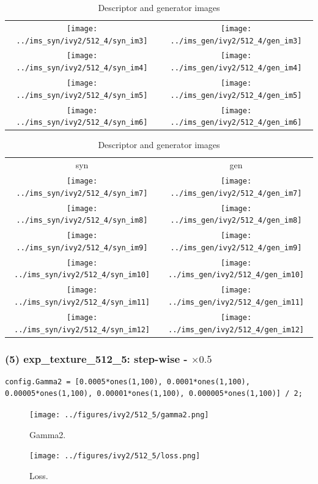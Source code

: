 \documentclass[letter]{article}
\begin{document}
\begin{table}[h!]
\begin{tabular}{cc}
		\texttt{[image: ../ims\_syn/ivy2/512\_4/syn\_im3]} & \texttt{[image: ../ims\_gen/ivy2/512\_4/gen\_im3]} \tabularnewline
		\texttt{[image: ../ims\_syn/ivy2/512\_4/syn\_im4]} & \texttt{[image: ../ims\_gen/ivy2/512\_4/gen\_im4]} \tabularnewline
		\texttt{[image: ../ims\_syn/ivy2/512\_4/syn\_im5]} & \texttt{[image: ../ims\_gen/ivy2/512\_4/gen\_im5]} \tabularnewline
		\texttt{[image: ../ims\_syn/ivy2/512\_4/syn\_im6]} & \texttt{[image: ../ims\_gen/ivy2/512\_4/gen\_im6]} \tabularnewline
	\end{tabular}
	\begin{tabular}{cc}
		syn & gen\tabularnewline
		\texttt{[image: ../ims\_syn/ivy2/512\_4/syn\_im7]} & \texttt{[image: ../ims\_gen/ivy2/512\_4/gen\_im7]} \tabularnewline
		\texttt{[image: ../ims\_syn/ivy2/512\_4/syn\_im8]} & \texttt{[image: ../ims\_gen/ivy2/512\_4/gen\_im8]} \tabularnewline
		\texttt{[image: ../ims\_syn/ivy2/512\_4/syn\_im9]} & \texttt{[image: ../ims\_gen/ivy2/512\_4/gen\_im9]} \tabularnewline
		\texttt{[image: ../ims\_syn/ivy2/512\_4/syn\_im10]} & \texttt{[image: ../ims\_gen/ivy2/512\_4/gen\_im10]} \tabularnewline
		\texttt{[image: ../ims\_syn/ivy2/512\_4/syn\_im11]} & \texttt{[image: ../ims\_gen/ivy2/512\_4/gen\_im11]} \tabularnewline
		\texttt{[image: ../ims\_syn/ivy2/512\_4/syn\_im12]} & \texttt{[image: ../ims\_gen/ivy2/512\_4/gen\_im12]} \tabularnewline
	\end{tabular}
	\caption{Descriptor and generator images}
\end{table}

\newpage

\subsubsection*{(5) exp\_texture\_512\_5: step-wise - $\times0.5$}

\begin{lstlisting}
config.Gamma2 = [0.0005*ones(1,100), 0.0001*ones(1,100), 0.00005*ones(1,100), 0.00001*ones(1,100), 0.000005*ones(1,100)] / 2;
\end{lstlisting}

\begin{figure}[h!]
	\centering
	\texttt{[image: ../figures/ivy2/512\_5/gamma2.png]}
	\caption{\label{fig:gamma1}Gamma2.}
\end{figure}

\begin{figure}[h!]
	\centering
	\texttt{[image: ../figures/ivy2/512\_5/loss.png]}
	\caption{\label{fig:gamma1}Loss.}
\end{figure}
\end{document}
